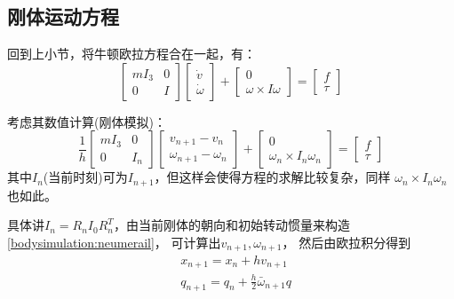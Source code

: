 \documentclass[lang=cn,newtx,10pt,scheme=chinese]{elegantbook}
\begin{document}
\subsection{刚体运动方程}
回到上小节，将牛顿欧拉方程合在一起，有：
\begin{equation}
  \left[\begin{array}{cc}
  m I_3 & 0 \\
  0 & I
  \end{array}\right]\left[\begin{array}{c}
  \dot{v} \\
  \dot{\omega}
  \end{array}\right]+\left[\begin{array}{c}
  0 \\
  \omega \times I \omega
  \end{array}\right]=\left[\begin{array}{c}
  f \\
  \tau
  \end{array}\right]
\end{equation}

考虑其数值计算(刚体模拟)：
\begin{equation}
  \label{bodysimulation:neumerail}
  \frac{1}{h}\left[\begin{array}{cc}
  m I_3 & 0 \\
  0 & I_n
  \end{array}\right]\left[\begin{array}{c}
  v_{n+1}-v_n \\
  \omega_{n+1}-\omega_n
  \end{array}\right]+\left[\begin{array}{c}
  0 \\
  \omega_n \times I_n \omega_n
  \end{array}\right]=\left[\begin{array}{l}
  f \\
  \tau
  \end{array}\right]
\end{equation}
其中$I_n$(当前时刻)可为$I_{n+1}$，但这样会使得方程的求解比较复杂，同样
$\omega_n \times I_n \omega_n$也如此。

具体讲$I_n = R_n I_0 R^{T}_n$，由当前刚体的朝向和初始转动惯量来构造\ref{bodysimulation:neumerail}，
可计算出$v_{n+1}, \omega_{n+1}$，
然后由欧拉积分得到
\begin{equation}
  \begin{aligned}
  & x_{n+1}=x_n+h v_{n+1} \\
  & q_{n+1}=q_n+\frac{h}{2} \bar{\omega}_{n+1} q
  \end{aligned}
\end{equation}
\end{document}
